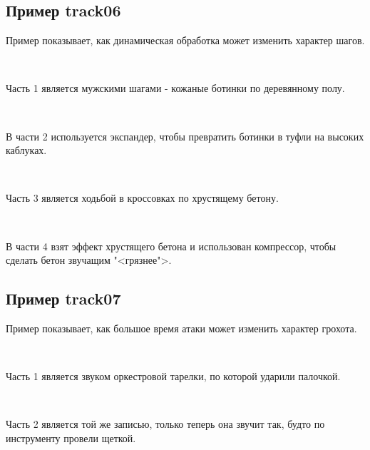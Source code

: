 \documentclass{beamer}
\begin{document}
\subsection{Пример track06}
\begin{frame}
Пример показывает, как динамическая обработка может изменить характер шагов.

~

Часть 1 является мужскими шагами - кожаные ботинки по деревянному полу.

~

В части 2 используется экспандер, чтобы превратить ботинки в туфли на высоких каблуках.

~

Часть 3 является ходьбой в кроссовках по хрустящему бетону.

~

В части 4 взят эффект хрустящего бетона и использован компрессор, чтобы сделать бетон звучащим "<грязнее">.
\end{frame}

\subsection{Пример track07}
\begin{frame}
Пример показывает, как большое время атаки может изменить характер грохота.

~

Часть 1 является звуком оркестровой тарелки, по которой ударили палочкой.

~

Часть 2 является той же записью, только теперь она звучит так, будто по инструменту провели щеткой.
\end{frame}
\end{document}
